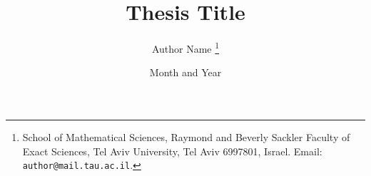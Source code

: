 \documentclass{article}
\begin{document}
\title{Thesis Title}
\author{
Author Name
\thanks{School of Mathematical Sciences, Raymond and Beverly Sackler Faculty of Exact Sciences, Tel Aviv University, Tel Aviv 6997801, Israel.
Email: {\tt author@mail.tau.ac.il}.}
}
\date{Month and Year}

\usepackage[utf8]{inputenc}
\usepackage{csquotes}
\usepackage[hebrew,english]{babel}
\usepackage{biblatex}
\usepackage{amsmath}
\usepackage{tikz}
\usepackage{indentfirst}
\usepackage{lipsum}  



\parskip 2mm
\addtolength{\textwidth}{1.4in} \addtolength{\oddsidemargin}{-0.5in}
\addtolength{\evensidemargin}{-0.8in}
\addtolength{\topmargin}{-0.5in} \addtolength{\textheight}{0.1in}

\end{document}
